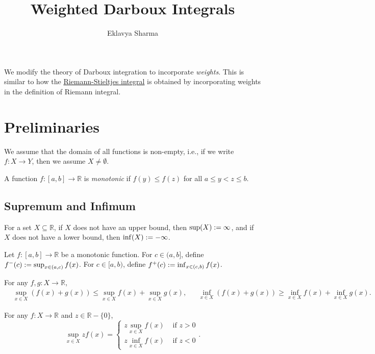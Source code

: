 \documentclass[a4paper,12pt,fleqn]{article}
\author{Eklavya Sharma}
\date{\empty}
\title{Weighted Darboux Integrals}
\begin{document}
\maketitle
\setlength{\parskip}{0.2em}

We modify the theory of Darboux integration to incorporate \emph{weights}.
This is similar to how the
\href{https://en.wikipedia.org/wiki/Riemann\%E2\%80\%93Stieltjes_integral}{Riemann-Stieltjes integral}
is obtained by incorporating weights in the definition of Riemann integral.

\section{Preliminaries}

We assume that the domain of all functions is non-empty,
i.e., if we write $f: X \to Y$, then we assume $X \neq \emptyset$.

\begin{definition}
A function $f: [a, b] \to \mathbb{R}$ is \emph{monotonic} if
$f(y) \le f(z)$ for all $a \le y < z \le b$.
\end{definition}

\subsection{Supremum and Infimum}

For a set $X \subseteq \mathbb{R}$,
if $X$ does not have an upper bound, then $\sup(X) := \infty$,
and if $X$ does not have a lower bound, then $\inf(X) := -\infty$.

\begin{definition}
Let $f: [a, b] \to \mathbb{R}$ be a monotonic function.
For $c \in (a, b]$, define $f^-(c) := \sup_{x \in (a, c)} f(x)$.
For $c \in [a, b)$, define $f^+(c) := \inf_{x \in (c, b)} f(x)$.
\end{definition}

\begin{lemma}
\label{thm:sum-of-sup-inf}
For any $f, g: X \to \mathbb{R}$,
\begin{align*}
& \sup_{x \in X} (f(x) + g(x)) \le \sup_{x \in X} f(x) + \sup_{x \in X} g(x),
&& \inf_{x \in X} (f(x) + g(x)) \ge \inf_{x \in X} f(x) + \inf_{x \in X} g(x).
\end{align*}
\end{lemma}

\begin{lemma}
\label{thm:scaling-sup-inf}
For any $f: X \to \mathbb{R}$ and $z \in \mathbb{R} - \{0\}$,
\[ \sup_{x \in X} zf(x) = \begin{cases}
z\sup_{x \in X} f(x) & \text{ if } z > 0
\\ z\inf_{x \in X} f(x) & \text{ if } z < 0
\end{cases}. \]
\end{lemma}
\end{document}
